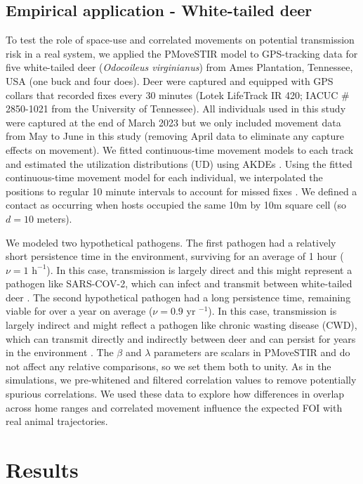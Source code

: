 \documentclass[letterpaper]{article}
\begin{document}
\subsection*{Empirical application - White-tailed deer}

To test the role of space-use and correlated movements on potential transmission risk in a real system, we applied the PMoveSTIR model to GPS-tracking data for five white-tailed deer (\emph{Odocoileus virginianus}) from Ames Plantation, Tennessee, USA (one buck and four does). 
Deer were captured and equipped with GPS collars that recorded fixes every 30 minutes (Lotek LifeTrack IR 420; IACUC \# 2850-1021 from the University of Tennessee).  All individuals used in this study were captured at the end of March 2023 but we only included movement data from May to June in this study (removing April data to eliminate any capture effects on movement).  We fitted continuous-time movement models to each track and estimated the utilization distributions (UD) using AKDEs \citep{Calabrese2016}. Using the fitted continuous-time movement model for each individual, we interpolated the positions to regular 10 minute intervals to account for missed fixes \citep{Yang2023}.  We defined a contact as occurring when hosts occupied the same 10m by 10m square cell (so $d = 10$ meters). 

We modeled two hypothetical pathogens. The first pathogen had a relatively short persistence time in the environment, surviving for an average of 1 hour  ($\nu=1\text{ h}^{-1 }$). In this case, transmission is largely direct and this might represent a pathogen like SARS-COV-2, which can infect and transmit between white-tailed deer \citep{Hale2022}. The second hypothetical pathogen had a long persistence time, remaining viable for over a year on average ($\nu=0.9 \text{ yr }^{-1}$). In this case, transmission is largely indirect and might reflect a pathogen like chronic wasting disease (CWD), which can transmit directly and indirectly between deer and can persist for years in the environment \citep{Saunders2012a}. The $\beta$ and $\lambda$ parameters are scalars in PMoveSTIR and do not affect any relative comparisons, so we set them both to unity. As in the simulations, we pre-whitened and filtered correlation values to remove potentially spurious correlations. 
We used these data to explore how differences in overlap across home ranges and correlated movement influence the expected FOI with real animal trajectories.

\section*{Results}
\end{document}

